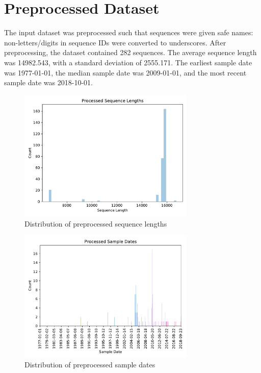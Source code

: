 \documentclass{article}
\begin{document}
\section{Preprocessed Dataset}
The input dataset was preprocessed such that sequences were given safe names: non-letters/digits in sequence IDs were converted to underscores. After preprocessing, the dataset contained 282 sequences. The average sequence length was 14982.543, with a standard deviation of 2555.171. The earliest sample date was 1977-01-01, the median sample date was 2009-01-01, and the most recent sample date was 2018-10-01.

\begin{figure}[h]
\centering
\includegraphics[width=0.75\textwidth,keepaspectratio]{./figs/processed_sequence_lengths.pdf}
\caption{Distribution of preprocessed sequence lengths}
\end{figure}



\begin{figure}[h]
\centering
\includegraphics[width=0.75\textwidth,keepaspectratio]{./figs/processed_sample_dates.pdf}
\caption{Distribution of preprocessed sample dates}
\end{figure}
\end{document}
